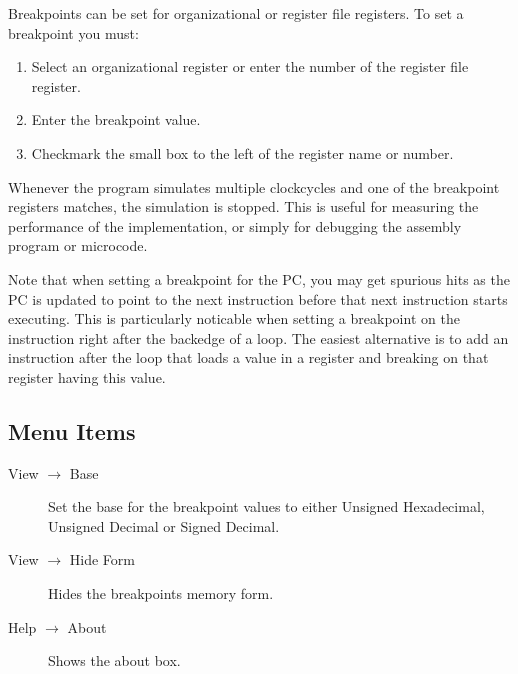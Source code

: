 \documentclass{article}
\begin{document}
Breakpoints can be set for organizational or register file registers. To set a breakpoint you must:

\begin{enumerate}
\item Select an organizational register or enter the number of the register file register.
\item Enter the breakpoint value.
\item Checkmark the small box to the left of the register name or number.
\end{enumerate}

Whenever the program simulates multiple clockcycles and one of the 
breakpoint registers matches, the simulation is stopped. This is useful 
for measuring the performance of the implementation, or simply for 
debugging the assembly program or microcode.

Note that when setting a breakpoint for the PC, you may get spurious hits as
the PC is updated to point to the next instruction before that next instruction
starts executing.  This is particularly noticable when setting a breakpoint on
the instruction right after the backedge of a loop.  The easiest alternative is
to add an instruction after the loop that loads a value in a register and
breaking on that register having this value.

\subsection{Menu Items}

\begin{description}
\item[View $\to$ Base] Set the base for the breakpoint values to either Unsigned Hexadecimal, Unsigned Decimal or Signed Decimal.
\item[View $\to$ Hide Form] Hides the breakpoints memory form. 
\item[Help $\to$ About] Shows the about box.
\end{description}
\end{document}
